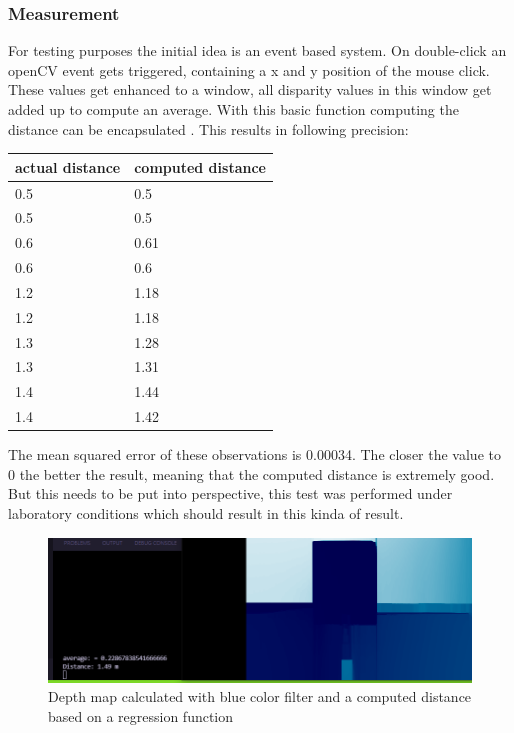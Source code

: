 \documentclass[journal,onecolumn]{IEEEtran}
\begin{document}
\subsubsection{Measurement}
For testing purposes the initial idea is an event based system. On double-click an openCV event gets triggered, containing a x and y position of the mouse click. These values get enhanced to a window, all disparity values in this window get added up to compute an average. With this basic function computing the distance can be encapsulated . This results in following precision:
\begin{table}[H]
	\begin{tabular}{|l|l|}
		\hline
		actual distance & computed distance \\ \hline
		0.5             & 0.5               \\ \hline
		0.5             & 0.5               \\ \hline
		0.6             & 0.61              \\ \hline
		0.6             & 0.6               \\ \hline
		1.2             & 1.18              \\ \hline
		1.2             & 1.18              \\ \hline
		1.3             & 1.28              \\ \hline
		1.3             & 1.31              \\ \hline
		1.4             & 1.44              \\ \hline
		1.4             & 1.42              \\ \hline
	\end{tabular}
\end{table}
\noindent The mean squared error of these observations is 0.00034. The closer the value to 0 the better the result, meaning that the computed distance is extremely good. But this needs to be put into perspective, this test was performed under laboratory conditions which should result in this kinda of result.
\begin{figure}[H]
	\centering
	\includegraphics[scale=0.5]{distanceCalcRegression.png}
	\captionsetup{justification=centering}
	\caption{Depth map calculated with blue color filter and a computed distance based on a regression function}
\end{figure}
\end{document}
